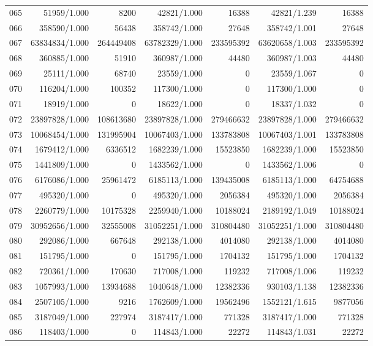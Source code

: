 \begin{longtable}{crrrrrr}
065 & 51959/1.000 & 8200 & 42821/1.000 & 16388 & 42821/1.239 & 16388 \\
066 & 358590/1.000 & 56438 & 358742/1.000 & 27648 & 358742/1.001 & 27648 \\
067 & 63834834/1.000 & 264449408 & 63782329/1.000 & 233595392 & 63620658/1.003 & 233595392 \\
068 & 360885/1.000 & 51910 & 360987/1.000 & 44480 & 360987/1.003 & 44480 \\
069 & 25111/1.000 & 68740 & 23559/1.000 & 0 & 23559/1.067 & 0 \\
070 & 116204/1.000 & 100352 & 117300/1.000 & 0 & 117300/1.000 & 0 \\
071 & 18919/1.000 & 0 & 18622/1.000 & 0 & 18337/1.032 & 0 \\
072 & 23897828/1.000 & 108613680 & 23897828/1.000 & 279466632 & 23897828/1.000 & 279466632 \\
073 & 10068454/1.000 & 131995904 & 10067403/1.000 & 133783808 & 10067403/1.001 & 133783808 \\
074 & 1679412/1.000 & 6336512 & 1682239/1.000 & 15523850 & 1682239/1.000 & 15523850 \\
075 & 1441809/1.000 & 0 & 1433562/1.000 & 0 & 1433562/1.006 & 0 \\
076 & 6176086/1.000 & 25961472 & 6185113/1.000 & 139435008 & 6185113/1.000 & 64754688 \\
077 & 495320/1.000 & 0 & 495320/1.000 & 2056384 & 495320/1.000 & 2056384 \\
078 & 2260779/1.000 & 10175328 & 2259940/1.000 & 10188024 & 2189192/1.049 & 10188024 \\
079 & 30952656/1.000 & 32555008 & 31052251/1.000 & 310804480 & 31052251/1.000 & 310804480 \\
080 & 292086/1.000 & 667648 & 292138/1.000 & 4014080 & 292138/1.000 & 4014080 \\
081 & 151795/1.000 & 0 & 151795/1.000 & 1704132 & 151795/1.000 & 1704132 \\
082 & 720361/1.000 & 170630 & 717008/1.000 & 119232 & 717008/1.006 & 119232 \\
083 & 1057993/1.000 & 13934688 & 1040648/1.000 & 12382336 & 930103/1.138 & 12382336 \\
084 & 2507105/1.000 & 9216 & 1762609/1.000 & 19562496 & 1552121/1.615 & 9877056 \\
085 & 3187049/1.000 & 227974 & 3187417/1.000 & 771328 & 3187417/1.000 & 771328 \\
086 & 118403/1.000 & 0 & 114843/1.000 & 22272 & 114843/1.031 & 22272 \\

\end{longtable}
